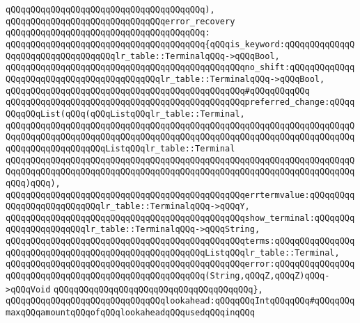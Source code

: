 \verb|qQQqqQQqqQQqqQQqqQQqqQQqqQQqqQQqqQQqqQQq),|\newline
\newline
\newline
\verb|qQQqqQQqqQQqqQQqqQQqqQQqqQQqqQQqerror_recovery|\newline
\verb|qQQqqQQqqQQqqQQqqQQqqQQqqQQqqQQqqQQqqQQq:|\newline
\verb|qQQqqQQqqQQqqQQqqQQqqQQqqQQqqQQqqQQqqQQq{qQQqis_keyword:qQQqqQQqqQQqqQQqqQQqqQQqqQQqqQQqqQQqlr_table::TerminalqQQq->qQQqBool,|\newline
\verb|qQQqqQQqqQQqqQQqqQQqqQQqqQQqqQQqqQQqqQQqqQQqqQQqno_shift:qQQqqQQqqQQqqQQqqQQqqQQqqQQqqQQqqQQqqQQqqQQqlr_table::TerminalqQQq->qQQqBool,|\newline
\verb|qQQqqQQqqQQqqQQqqQQqqQQqqQQqqQQqqQQqqQQqqQQqqQQq#qQQqqQQqqQQq|\newline
\verb|qQQqqQQqqQQqqQQqqQQqqQQqqQQqqQQqqQQqqQQqqQQqqQQqpreferred_change:qQQqqQQqqQQqList(qQQq(qQQqListqQQqlr_table::Terminal,|\newline
\verb|qQQqqQQqqQQqqQQqqQQqqQQqqQQqqQQqqQQqqQQqqQQqqQQqqQQqqQQqqQQqqQQqqQQqqQQqqQQqqQQqqQQqqQQqqQQqqQQqqQQqqQQqqQQqqQQqqQQqqQQqqQQqqQQqqQQqqQQqqQQqqQQqqQQqqQQqqQQqqQQqListqQQqlr_table::Terminal|\newline
\verb|qQQqqQQqqQQqqQQqqQQqqQQqqQQqqQQqqQQqqQQqqQQqqQQqqQQqqQQqqQQqqQQqqQQqqQQqqQQqqQQqqQQqqQQqqQQqqQQqqQQqqQQqqQQqqQQqqQQqqQQqqQQqqQQqqQQqqQQqqQQqqQQq)qQQq),|\newline
\newline
\verb|qQQqqQQqqQQqqQQqqQQqqQQqqQQqqQQqqQQqqQQqqQQqqQQqerrtermvalue:qQQqqQQqqQQqqQQqqQQqqQQqqQQqlr_table::TerminalqQQq->qQQqY,|\newline
\verb|qQQqqQQqqQQqqQQqqQQqqQQqqQQqqQQqqQQqqQQqqQQqqQQqshow_terminal:qQQqqQQqqQQqqQQqqQQqqQQqlr_table::TerminalqQQq->qQQqString,|\newline
\newline
\verb|qQQqqQQqqQQqqQQqqQQqqQQqqQQqqQQqqQQqqQQqqQQqqQQqterms:qQQqqQQqqQQqqQQqqQQqqQQqqQQqqQQqqQQqqQQqqQQqqQQqqQQqqQQqListqQQqlr_table::Terminal,|\newline
\verb|qQQqqQQqqQQqqQQqqQQqqQQqqQQqqQQqqQQqqQQqqQQqqQQqerror:qQQqqQQqqQQqqQQqqQQqqQQqqQQqqQQqqQQqqQQqqQQqqQQqqQQqqQQq(String,qQQqZ,qQQqZ)qQQq->qQQqVoid|\newline
\verb|qQQqqQQqqQQqqQQqqQQqqQQqqQQqqQQqqQQqqQQq},|\newline
\newline
\verb|qQQqqQQqqQQqqQQqqQQqqQQqqQQqqQQqlookahead:qQQqqQQqIntqQQqqQQq#qQQqqQQqmaxqQQqamountqQQqofqQQqlookaheadqQQqusedqQQqinqQQq|\newline
